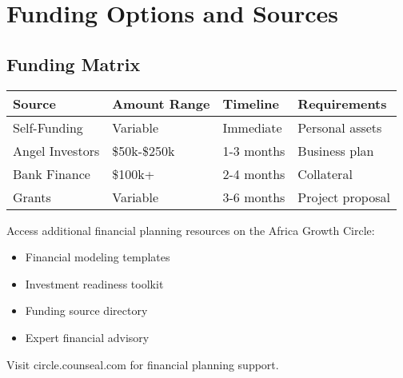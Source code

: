 \section{Funding Options and Sources}

\subsection{Funding Matrix}
\begin{center}
\begin{tabular}{p{}|p{}|p{}|p{}}
    \textbf{Source} & \textbf{Amount Range} & \textbf{Timeline} & \textbf{Requirements} \\
    \hline
    Self-Funding & Variable & Immediate & Personal assets \\
    Angel Investors & \$50k-\$250k & 1-3 months & Business plan \\
    Bank Finance & \$100k+ & 2-4 months & Collateral \\
    Grants & Variable & 3-6 months & Project proposal \\
\end{tabular}
\end{center}

\begin{communitybox}
Access additional financial planning resources on the Africa Growth Circle:
\begin{itemize}
    \item Financial modeling templates
    \item Investment readiness toolkit
    \item Funding source directory
    \item Expert financial advisory
\end{itemize}
Visit circle.counseal.com for financial planning support.
\end{communitybox}


